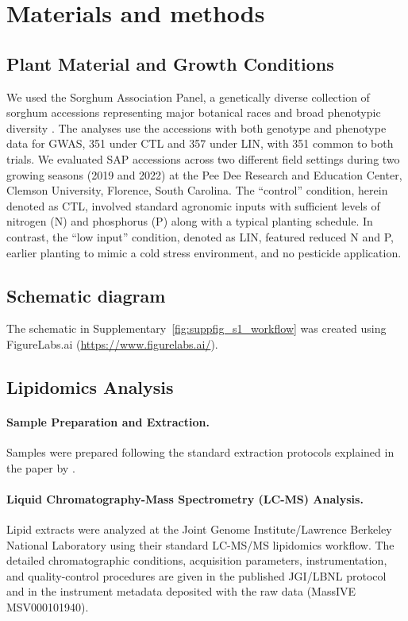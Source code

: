 \documentclass[9pt,twocolumn,twoside]{rilabRxiv}
\begin{document}
\section*{Materials and methods}

\subsection*{Plant Material and Growth Conditions}

We used the Sorghum Association Panel, a genetically diverse collection of sorghum accessions representing major botanical races and broad phenotypic diversity \citep{Casa2008CommunityResourcesSorghum, Boatwright2022}. The analyses use the accessions with both genotype and phenotype data for GWAS, 351 under CTL and 357 under LIN, with 351 common to both trials. We evaluated SAP accessions across two different field settings during two growing seasons (2019 and 2022) at the Pee Dee Research and Education Center, Clemson University, Florence, South Carolina. The ``control'' condition, herein denoted as CTL, involved standard agronomic inputs with sufficient levels of nitrogen (N) and phosphorus (P) along with a typical planting schedule. In contrast, the ``low input'' condition, denoted as LIN, featured reduced N and P, earlier planting to mimic a cold stress environment, and no pesticide application.

\subsection*{Schematic diagram}

The schematic in Supplementary~\ref{fig:suppfig_s1_workflow} was created using FigureLabs.ai (\url{https://www.figurelabs.ai/}).

\subsection*{Lipidomics Analysis}

\paragraph{Sample Preparation and Extraction.}
Samples were prepared following the standard extraction protocols explained in the paper by \citep{Barnes2022}.

\paragraph{Liquid Chromatography-Mass Spectrometry (LC-MS) Analysis.}
Lipid extracts were analyzed at the Joint Genome Institute/Lawrence Berkeley National Laboratory using their standard LC-MS/MS lipidomics workflow. The detailed chromatographic conditions, acquisition parameters, instrumentation, and quality-control procedures are given in the published JGI/LBNL protocol \citep{Louie2025JGI_Lipids} and in the instrument metadata deposited with the raw data (MassIVE MSV000101940).
\end{document}
